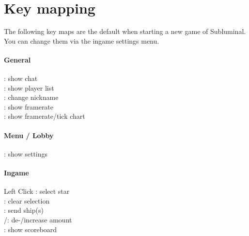 \chapter*{Key mapping}
The following key maps are the default when starting a new game of Subluminal. You can change them via the ingame settings menu.

\begin{multicols*}{3}
  \subsubsection{General}
  \noindent{} : show chat \\[0.5em]
   : show player list \\[0.5em]
   : change nickname \\[0.5em]
   : show framerate \\[0.5em]
   : show framerate/tick chart \\[0.5em]
  
  \subsubsection{Menu / Lobby}
  \noindent{\Esc} : show settings\\[0.5em]

  \subsubsection{Ingame}
  Left Click : select star \\[0.5em]
  \Esc : clear selection\\[0.5em]
  \Return : send ship(s) \\[0.5em]
  \LArrow/\RArrow : de-/increase amount \\[0.5em]
  \Tab : show scoreboard \\[0.5em]
\end{multicols*}
